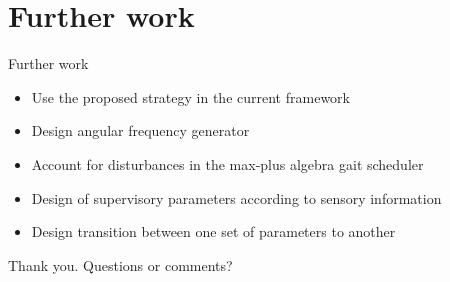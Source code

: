 \documentclass{beamer}
\begin{document}
\section{Further work}


\begin{frame}{Further work}
	\begin{itemize}\setlength\itemsep{0.5em}
		\item Use the proposed strategy in the current framework
		\item Design angular frequency generator
		\item Account for disturbances in the max-plus algebra gait scheduler
		\item Design of supervisory parameters according to sensory information
		\item Design transition between one set of parameters to another
	\end{itemize}
\end{frame}

\begin{frame}
 \hspace{2cm} Thank you. Questions or comments?
\end{frame}
\end{document}
